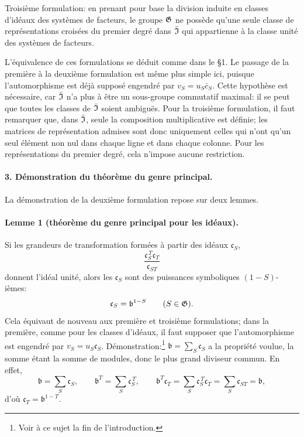 Troisième formulation: en prenant pour base la division induite en classes d'idéaux des systèmes de facteurs, le groupe \(\mathfrak G\) ne possède qu'une seule classe de représentations croisées du premier degré dans \(\bar{\mathfrak I}\) qui appartienne à la classe unité des systèmes de facteurs.

L'équivalence de ces formulations se déduit comme dans le \S{}1. Le passage de la première à la deuxième formulation est même plus simple ici, puisque l'automorphisme est déjà supposé engendré par \(v_S=u_S\bar c_S\). Cette hypothèse est nécessaire, car \(\bar{\mathfrak I}\) n'a plus à être un sous-groupe commutatif maximal: il se peut que toutes les classes de \(\bar{\mathfrak I}\) soient ambiguës. Pour la troisième formulation, il faut remarquer que, dans \(\bar{\mathfrak I}\), seule la composition multiplicative est définie; les matrices de représentation admises sont donc uniquement celles qui n'ont qu'un seul élément non nul dans chaque ligne et dans chaque colonne. Pour les représentations du premier degré, cela n'impose aucune restriction.

\paragraph{3. Démonstration du théorème du genre principal.}
La démonstration de la deuxième formulation repose sur deux lemmes.

\paragraph{Lemme 1 (théorème du genre principal pour les idéaux).}
Si les grandeurs de transformation formées à partir des idéaux \(\mathfrak c_S\),
\[
        \frac{\mathfrak c_S^{\,T}\mathfrak c_T}{\mathfrak c_{ST}}
\]
donnent l'idéal unité, alors les \(\mathfrak c_S\) sont des puissances symboliques \((1-S)\)-ièmes:
\[
        \mathfrak c_S=\mathfrak b^{1-S}\qquad(S\in\mathfrak G).
\]
Cela équivaut de nouveau aux première et troisième formulations; dans la première, comme pour les classes d'idéaux, il faut supposer que l'automorphisme est engendré par \(v_S=u_S\mathfrak c_S\). Démonstration:\footnote{Voir à ce sujet la fin de l'introduction.} \(\mathfrak b=\sum_S\mathfrak c_S\) a la propriété voulue, la somme étant la somme de modules, donc le plus grand diviseur commun. En effet,
\[
        \mathfrak b=\sum_S \mathfrak c_S,\qquad
        \mathfrak b^T=\sum_S \mathfrak c_S^{\,T},\qquad
        \mathfrak b^T\mathfrak c_T
        =\sum_S \mathfrak c_S^{\,T}\mathfrak c_T
        =\sum_S \mathfrak c_{ST}=\mathfrak b,
\]
d'où \(\mathfrak c_T=\mathfrak b^{1-T}\).

